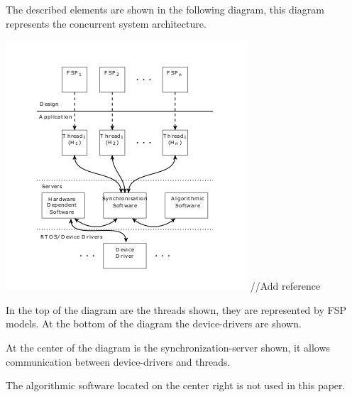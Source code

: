 The described elements are shown in the following diagram, this diagram
represents the concurrent system architecture.

\includegraphics{../img/system_architecture.png} //Add reference

In the top of the diagram are the threads shown, they are represented by
FSP models. At the bottom of the diagram the device-drivers are shown.

At the center of the diagram is the synchronization-server shown, it
allows communication between device-drivers and threads.

The algorithmic software located on the center right is not used in this
paper.

